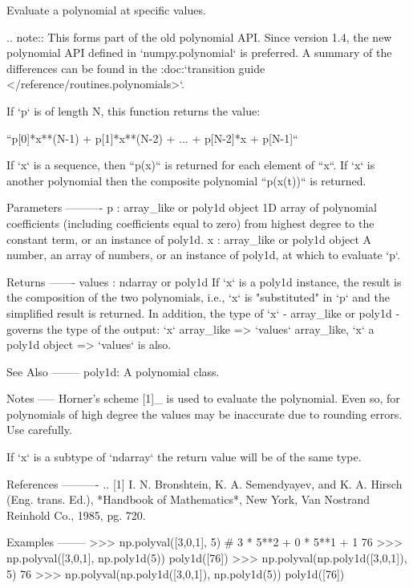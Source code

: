\begin{DoxyVerb}Evaluate a polynomial at specific values.

.. note::
   This forms part of the old polynomial API. Since version 1.4, the
   new polynomial API defined in `numpy.polynomial` is preferred.
   A summary of the differences can be found in the
   :doc:`transition guide </reference/routines.polynomials>`.

If `p` is of length N, this function returns the value:

    ``p[0]*x**(N-1) + p[1]*x**(N-2) + ... + p[N-2]*x + p[N-1]``

If `x` is a sequence, then ``p(x)`` is returned for each element of ``x``.
If `x` is another polynomial then the composite polynomial ``p(x(t))``
is returned.

Parameters
----------
p : array_like or poly1d object
   1D array of polynomial coefficients (including coefficients equal
   to zero) from highest degree to the constant term, or an
   instance of poly1d.
x : array_like or poly1d object
   A number, an array of numbers, or an instance of poly1d, at
   which to evaluate `p`.

Returns
-------
values : ndarray or poly1d
   If `x` is a poly1d instance, the result is the composition of the two
   polynomials, i.e., `x` is "substituted" in `p` and the simplified
   result is returned. In addition, the type of `x` - array_like or
   poly1d - governs the type of the output: `x` array_like => `values`
   array_like, `x` a poly1d object => `values` is also.

See Also
--------
poly1d: A polynomial class.

Notes
-----
Horner's scheme [1]_ is used to evaluate the polynomial. Even so,
for polynomials of high degree the values may be inaccurate due to
rounding errors. Use carefully.

If `x` is a subtype of `ndarray` the return value will be of the same type.

References
----------
.. [1] I. N. Bronshtein, K. A. Semendyayev, and K. A. Hirsch (Eng.
   trans. Ed.), *Handbook of Mathematics*, New York, Van Nostrand
   Reinhold Co., 1985, pg. 720.

Examples
--------
>>> np.polyval([3,0,1], 5)  # 3 * 5**2 + 0 * 5**1 + 1
76
>>> np.polyval([3,0,1], np.poly1d(5))
poly1d([76])
>>> np.polyval(np.poly1d([3,0,1]), 5)
76
>>> np.polyval(np.poly1d([3,0,1]), np.poly1d(5))
poly1d([76])\end{DoxyVerb}
 \mbox{\label{namespacenumpy_1_1lib_1_1polynomial_a34f751d4a674960e5d7e1e275ec118a7}} 

